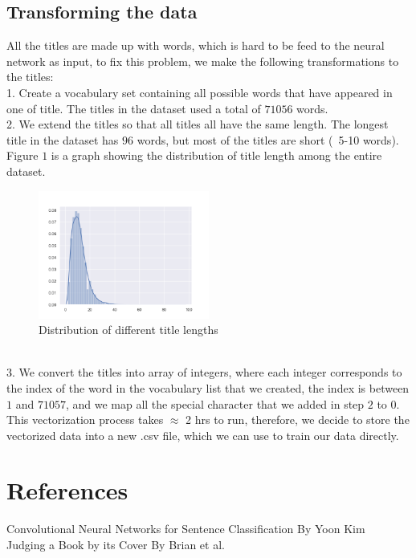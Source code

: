 \documentclass[jou,apacite, 10px]{apa6}
\begin{document}
\subsection{Transforming the data}
All the titles are made up with words, which is hard to be feed to the neural network as input, to fix this problem, we make the following transformations to the titles:\\
1. Create a vocabulary set containing all possible words that have appeared in one of title. The titles in the dataset used a total of $71056$ words.\\
2. We extend the titles so that all titles all have the same length. The longest title in the dataset has $96$ words, but most of the titles are short (~5-10 words). Figure $1$ is a graph showing the distribution of title length among the entire dataset.
\begin{figure}[h!]
    \centering
     \includegraphics[width=0.5\textwidth]{images/title_lengths}
      \caption{Distribution of different title lengths}
\end{figure}\\
3. We convert the titles into array of integers, where each integer corresponds to the index of the word in the vocabulary list that we created, the index is between $1$ and $71057$, and we map all the special character that we added in step $2$ to $0$.\\
This vectorization process takes $\approx$ 2 hrs to run, therefore, we decide to store the vectorized data into a new .csv file, which we can use to train our data directly.

\section{References}
\noindent Convolutional Neural Networks for Sentence Classification By Yoon Kim\\
Judging a Book by its Cover By Brian et al.
\end{document}
